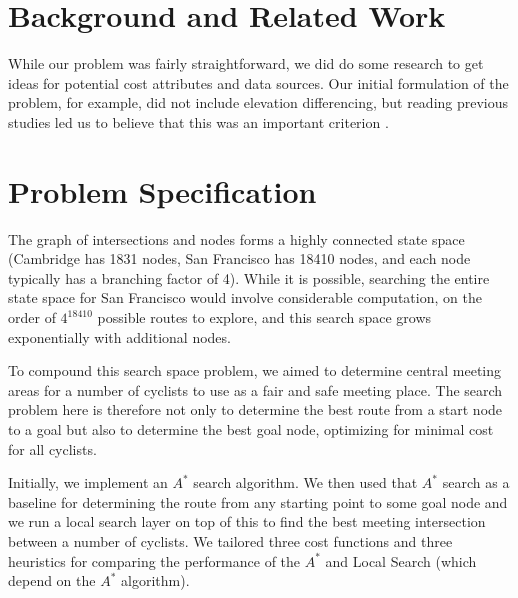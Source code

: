 \documentclass[11pt]{article}
\begin{document}


\section{Background and Related Work}

While our problem was fairly straightforward, we did do some research to get ideas for potential cost attributes and data sources. Our initial formulation of the problem, for example, did not include elevation differencing, but reading previous studies led us to believe that this was an important criterion \cite{pmbr}.

\section{Problem Specification}
The graph of intersections and nodes forms a highly connected state space (Cambridge has 1831 nodes, San Francisco has 18410 nodes, and each node typically has a branching factor of 4). While it is possible, searching the entire state space for San Francisco would involve considerable computation, on the order of $4^{18410}$ possible routes to explore, and this search space grows exponentially with additional nodes.
\par To compound this search space problem, we aimed to determine central meeting areas for a number of cyclists to use as a fair and safe meeting place. The search problem here is therefore not only to determine the best route from a start node to a goal but also to determine the best goal node, optimizing for minimal cost for all cyclists.
\par Initially, we implement an $A^{*}$ search algorithm. We then used that $A^{*}$ search as a baseline for determining the route from any starting point to some goal node and we run a local search layer on top of this to find the best meeting intersection between a number of cyclists. We tailored three cost functions and three heuristics for comparing the performance of the $A^{*}$ and Local Search (which depend on the $A^{*}$ algorithm).
\end{document}
